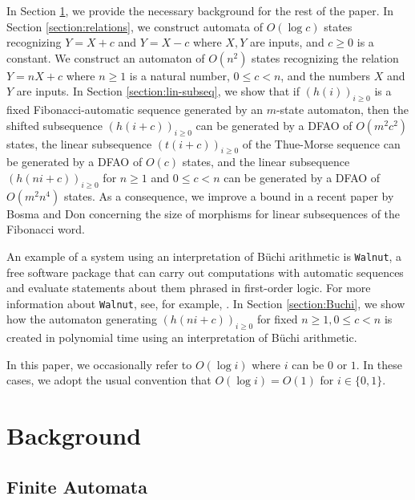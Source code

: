 \documentclass[12pt,reqno]{article}
\begin{document}
In Section \ref{section:background}, we provide the necessary background for the rest of the paper.
In Section \ref{section:relations}, we construct automata of $O(\log c)$ states recognizing $Y=X+c$ and $Y=X-c$ where $X, Y$ are inputs, and $c \geq 0$ is a constant. We construct an automaton of $O(n^2)$ states recognizing the relation $Y = nX+c$ where
$n \geq 1$ is a natural number, $0 \leq c < n$, and the numbers $X$ and $Y$ are inputs. In Section \ref{section:lin-subseq}, we show that if $(h(i))_{i \geq 0}$ is a fixed Fibonacci-automatic sequence generated by an $m$-state automaton, then the shifted subsequence $(h(i+c))_{i \geq 0}$ can be generated by a DFAO of $O(m^2c^2)$ states, the linear subsequence $(t(i+c))_{i \geq 0}$ of the Thue-Morse sequence 
can be generated by a DFAO of $O(c)$ states, and the linear subsequence
$(h(ni+c))_{i \geq 0}$ for $n \geq 1$ and $0 \leq c < n$ can be generated by a DFAO of 
$O(m^2n^4)$ states.
As a consequence, we improve a bound in a recent paper by Bosma and Don \cite{bosma_constructing_2024} concerning
the size of morphisms for linear subsequences of the Fibonacci word. 


An example of a system using an interpretation of B\"uchi arithmetic is {\tt Walnut}, a free software package that can carry out computations with automatic sequences and evaluate statements about them phrased in first-order logic. For more information about {\tt Walnut}, see, for example,
\cite{mousavi_automatic_2021, shallit_logical_2023}.  In Section \ref{section:Buchi}, we show how the automaton generating $(h(ni+c))_{i \geq 0}$ for fixed $n \geq 1, 0\leq c < n$ is created in polynomial time using an interpretation of B\"uchi arithmetic.

In this paper, we occasionally refer to $O(\log i)$ where $i$ can be $0$ or $1$. In these cases, we adopt the usual convention that $O(\log i) = O(1)$ for $i \in \{0,1 \}$.


\section{Background} \label{section:background}


\subsection{Finite Automata}
\label{subsection:fa}
\end{document}
